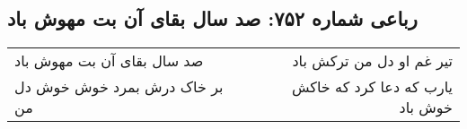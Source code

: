\begin{center}
\section*{رباعی شماره ۷۵۲: صد سال بقای آن بت مهوش باد}
\label{sec:0752}
\begin{longtable}{l p{0.5cm} r}
صد سال بقای آن بت مهوش باد
&&
تیر غم او دل من ترکش باد
\\
بر خاک درش بمرد خوش خوش دل من
&&
یارب که دعا کرد که خاکش خوش باد
\\
\end{longtable}
\end{center}

